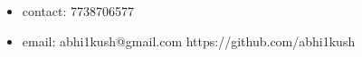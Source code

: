\begin{itemize}
\item[]\hspace{-0.32cm}{\bf Abhishek Pratap Singh}\hspace{10cm}contact: 7738706577\\[-0.6cm]
\item[]\hspace{-0.32cm}email: abhi1kush@gmail.com \hspace{7.5cm}https://github.com/abhi1kush\\[-0.6cm]
\end{itemize}



